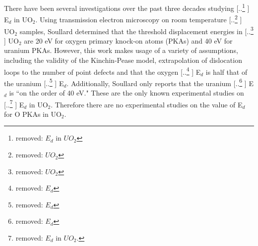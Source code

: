 \documentclass[review]{elsarticle} %
\providecommand{\DIFaddtex}[1]{{\protect\color{blue} \sf #1}} %
\providecommand{\DIFdeltex}[1]{{\protect\color{red} [..\footnote{removed: #1} ]}} %
\providecommand{\DIFaddbegin}{} %
\providecommand{\DIFaddend}{} %
\providecommand{\DIFdelbegin}{} %
\providecommand{\DIFdelend}{} %
\providecommand{\DIFadd}[1]{\texorpdfstring{\DIFaddtex{#1}}{#1}} %
\providecommand{\DIFdel}[1]{\texorpdfstring{\DIFdeltex{#1}}{}} %
\newcommand{\DIFscaledelfig}{0.5}
\newlength{\DIFdelgraphicswidth} %
\newlength{\DIFdelgraphicsheight} %
\newcommand{\DIFaddincludegraphics}[2][]{{\color{blue}\fbox{\DIFOincludegraphics[#1]{#2}}}} %
\newcommand{\DIFdelincludegraphics}[2][]{%
\sbox{\DIFdelgraphicsbox}{\DIFOincludegraphics[#1]{#2}}%
\settoboxwidth{\DIFdelgraphicswidth}{\DIFdelgraphicsbox} %
\settoboxtotalheight{\DIFdelgraphicsheight}{\DIFdelgraphicsbox} %
\scalebox{\DIFscaledelfig}{%
\parbox[b]{\DIFdelgraphicswidth}{\usebox{\DIFdelgraphicsbox}\\[-\baselineskip] \rule{\DIFdelgraphicswidth}{0em}}\llap{\resizebox{\DIFdelgraphicswidth}{\DIFdelgraphicsheight}{%
\setlength{\unitlength}{\DIFdelgraphicswidth}%
\begin{picture}(1,1)%
\thicklines\linethickness{2pt} %
{\color[rgb]{1,0,0}\put(0,0){\framebox(1,1){}}}%
{\color[rgb]{1,0,0}\put(0,0){\line( 1,1){1}}}%
{\color[rgb]{1,0,0}\put(0,1){\line(1,-1){1}}}%
\end{picture}%
}\hspace*{3pt}}} %
} %
\DeclareRobustCommand{\DIFaddbegin}{\DIFOaddbegin \let\includegraphics\DIFaddincludegraphics} %
\DeclareRobustCommand{\DIFaddend}{\DIFOaddend \let\includegraphics\DIFOincludegraphics} %
\DeclareRobustCommand{\DIFdelbegin}{\DIFOdelbegin \let\includegraphics\DIFdelincludegraphics} %
\DeclareRobustCommand{\DIFdelend}{\DIFOaddend \let\includegraphics\DIFOincludegraphics} %
\begin{document}
There have been several investigations over the past three decades studying \DIFdelbegin \DIFdel{$E_d$ in $UO_2$}\DIFdelend \DIFaddbegin \DIFadd{E$_d$ in UO$_2$}\DIFaddend . Using transmission electron microscopy on room temperature \DIFdelbegin \DIFdel{$UO_2$ }\DIFdelend \DIFaddbegin \DIFadd{UO$_2$ }\DIFaddend samples, Soullard \cite{soullard1977,soullard1985} determined that the threshold displacement energies in \DIFdelbegin \DIFdel{$UO_2$ }\DIFdelend \DIFaddbegin \DIFadd{UO$_2$ }\DIFaddend are 20 eV for oxygen primary knock-on atoms (PKAs) and 40 eV for uranium PKAs. However, this work makes usage of a variety of assumptions, including the validity of the Kinchin-Pease model, extrapolation of dislocation loops to the number of point defects and that the oxygen \DIFdelbegin \DIFdel{$E_d$ }\DIFdelend \DIFaddbegin \DIFadd{E$_d$ }\DIFaddend is half that of the uranium \DIFdelbegin \DIFdel{$E_d$}\DIFdelend \DIFaddbegin \DIFadd{E$_d$}\DIFaddend . Additionally, Soullard only reports that the uranium \DIFdelbegin \DIFdel{$E_d$ }\DIFdelend \DIFaddbegin \DIFadd{E$_d$ }\DIFaddend is ``on the order of 40 eV." These are the only known experimental studies on \DIFdelbegin \DIFdel{$E_d$ in $UO_2$. }\DIFdelend \DIFaddbegin \DIFadd{E$_d$ in UO$_2$. Therefore there are no experimental studies on the value of E$_d$ for O PKAs in UO$_2$.
}\DIFaddend 
\end{document}
